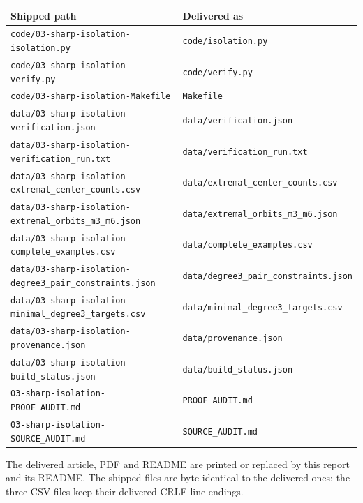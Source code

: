 \documentclass[11pt,letterpaper]{article}
\theoremstyle{definition}\newtheorem{definition}[theorem]{Definition}
\theoremstyle{remark}\newtheorem{remark}[theorem]{Remark}
\theoremstyle{definition}\newtheorem{question}[theorem]{Question}
\begin{document}
\begin{center}
\footnotesize
\begin{tabular}{@{}>{\raggedright}p{}>{\raggedright\arraybackslash}p{}@{}}
\toprule
Shipped path & Delivered as\\
\midrule
\nolinkurl{code/03-sharp-isolation-isolation.py} & \texttt{code/isolation.py}\\
\nolinkurl{code/03-sharp-isolation-verify.py} & \texttt{code/verify.py}\\
\nolinkurl{code/03-sharp-isolation-Makefile} & \texttt{Makefile}\\
\nolinkurl{data/03-sharp-isolation-verification.json} & \texttt{data/verification.json}\\
\nolinkurl{data/03-sharp-isolation-verification_run.txt} & \texttt{data/verification\_run.txt}\\
\nolinkurl{data/03-sharp-isolation-extremal_center_counts.csv} & \texttt{data/extremal\_center\_counts.csv}\\
\nolinkurl{data/03-sharp-isolation-extremal_orbits_m3_m6.json} & \texttt{data/extremal\_orbits\_m3\_m6.json}\\
\nolinkurl{data/03-sharp-isolation-complete_examples.csv} & \texttt{data/complete\_examples.csv}\\
\nolinkurl{data/03-sharp-isolation-degree3_pair_constraints.json} & \texttt{data/degree3\_pair\_constraints.json}\\
\nolinkurl{data/03-sharp-isolation-minimal_degree3_targets.csv} & \texttt{data/minimal\_degree3\_targets.csv}\\
\nolinkurl{data/03-sharp-isolation-provenance.json} & \texttt{data/provenance.json}\\
\nolinkurl{data/03-sharp-isolation-build_status.json} & \texttt{data/build\_status.json}\\
\nolinkurl{03-sharp-isolation-PROOF_AUDIT.md} & \texttt{PROOF\_AUDIT.md}\\
\nolinkurl{03-sharp-isolation-SOURCE_AUDIT.md} & \texttt{SOURCE\_AUDIT.md}\\
\bottomrule
\end{tabular}
\end{center}
The delivered article, PDF and README are printed or replaced by this report
and its README. The shipped files are byte-identical to the delivered ones;
the three CSV files keep their delivered CRLF line endings.
\end{document}

